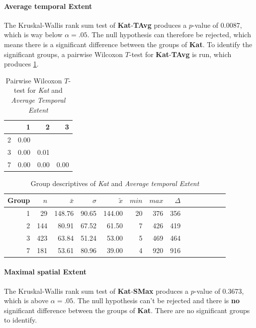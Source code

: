 \paragraph{Average temporal Extent}
The Kruskal-Wallis rank sum test of \textbf{Kat}-\textbf{TAvg} produces a $p$-value of 0.0087, which is way below $\alpha=.05$. The null hypothesis can therefore be rejected, which means there is a significant difference between the groups of \textbf{Kat}. To identify the significant groups, a pairwise Wilcoxon $T$-test for \textbf{Kat}-\textbf{TAvg} is run, which produces \cref{tbl:wilcoxon_baysis_initiator_Kat_TAvg}. 
\begin{table}[ht]
	\small
	\centering
    \begin{tabular}{rrrr}
        \toprule
        & 1 & 2 & 3 \\ 
        \midrule
        2 & 0.00 &  &  \\ 
        3 & 0.00 & 0.01 &  \\ 
        7 & 0.00 & 0.00 & 0.00 \\ 
        \bottomrule
    \end{tabular}
	\caption{Pairwise Wilcoxon $T$-test for \textit{Kat} and \textit{Average Temporal Extent}}
	\label{tbl:wilcoxon_baysis_initiator_Kat_TAvg}
\end{table}
\begin{table}[ht]
	\small
	\centering
    \begin{tabular}{rrrrrrrrrrrrrr}
        \toprule
        Group & $n$ & $\bar{x}$ & $\sigma$ & $\tilde{x}$ & $min$ & $max$ & $\Delta$ \\
        \midrule
        1 & 29  & 148.76 & 90.65 & 144.00 & 20 & 376 & 356 \\ 
        2 & 144 & 80.91  & 67.52 & 61.50  & 7  & 426 & 419 \\ 
        3 & 423 & 63.84  & 51.24 & 53.00  & 5  & 469 & 464 \\ 
        7 & 181 & 53.61  & 80.96 & 39.00  & 4  & 920 & 916 \\ 
        \bottomrule
    \end{tabular}
	\caption{Group descriptives of \textit{Kat} and \textit{Average temporal Extent}}
	\label{tbl:descriptives_baysis_initiator_Kat_TAvg}
\end{table}

\paragraph{Maximal spatial Extent}
The Kruskal-Wallis rank sum test of \textbf{Kat}-\textbf{SMax} produces a $p$-value of 0.3673, which is above $\alpha=.05$. The null hypothesis can't be rejected and there is \textbf{no} significant difference between the groups of \textbf{Kat}. There are no significant groups to identify.

